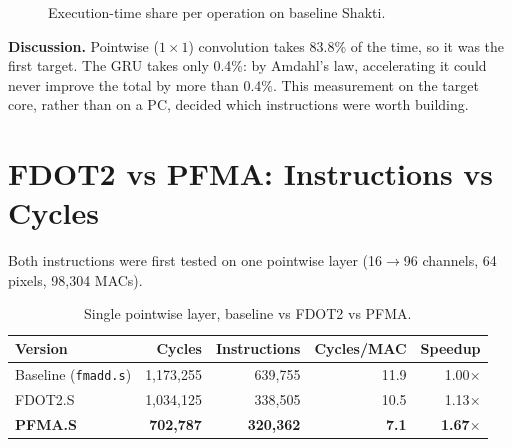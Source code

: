 \begin{figure}[h]
\centering
{}
\caption{Execution-time share per operation on baseline Shakti.}
\label{fig:profile}
\end{figure}

\textbf{Discussion.} Pointwise ($1\times1$) convolution takes 83.8\% of the
time, so it was the first target. The GRU takes only 0.4\%: by Amdahl's law,
accelerating it could never improve the total by more than 0.4\%. This
measurement on the target core, rather than on a PC, decided which
instructions were worth building.

\section{FDOT2 vs PFMA: Instructions vs Cycles}

Both instructions were first tested on one pointwise layer
(16$\rightarrow$96 channels, 64 pixels, 98,304 MACs).

\begin{table}[h]
\centering
\begin{tabular}{lrrrr}\toprule
Version & Cycles & Instructions & Cycles/MAC & Speedup\\\midrule
Baseline (\texttt{fmadd.s}) & 1,173,255 & 639,755 & 11.9 & 1.00$\times$\\
FDOT2.S & 1,034,125 & 338,505 & 10.5 & 1.13$\times$\\
\textbf{PFMA.S} & \textbf{702,787} & \textbf{320,362} & \textbf{7.1} & \textbf{1.67$\times$}\\\bottomrule
\end{tabular}
\caption{Single pointwise layer, baseline vs FDOT2 vs PFMA.}
\label{tab:fdot2pfma}
\end{table}

